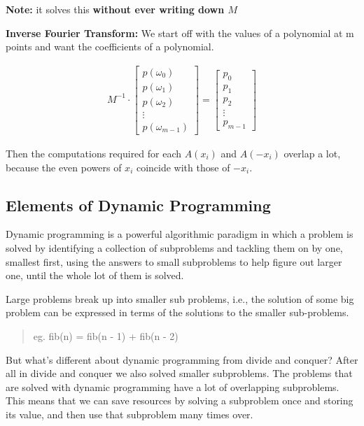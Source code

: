 \documentclass[12pt]{article}
\begin{document}
\textbf{Note:} it solves this \textbf{without ever writing down $M$}


\textbf{Inverse Fourier Transform:}
We start off with the values of a polynomial at m points and want the coefficients of a polynomial.

\begin{align*}
    M^{-1} \cdot \begin{bmatrix}
                     p(\omega_0) \\
                     p(\omega_1) \\
                     p(\omega_2) \\
                     \vdots      \\
                     p(\omega_{m - 1})
                 \end{bmatrix}
    = \begin{bmatrix}
          p_0    \\
          p_1    \\
          p_2    \\
          \vdots \\
          p_{m - 1}
      \end{bmatrix}
\end{align*}

Then the computations required for each $A(x_i)$ and $A(-x_i)$ overlap a lot, because the even powers of $x_i$ coincide with those of $-x_i$.

\lecture[]{}
\lecture[]{}
\lecture[]{}
\lecture[]{}
\lecture[]{}
\subsection{Elements of Dynamic Programming}
Dynamic programming is a powerful algorithmic paradigm in which a problem is solved by identifying a collection of subproblems and tackling them on by one, smallest first, using the answers to small subproblems to help figure out larger one, until the whole lot of them is solved.

Large problems break up into smaller sub problems, i.e., the solution of some big problem can be expressed in terms of the solutions to the smaller sub-problems.
\begin{quotation}
    eg. fib(n) = fib(n - 1) + fib(n - 2)
\end{quotation}
But what's different about dynamic programming from divide and conquer? After all in divide and conquer we also solved smaller subproblems. The problems that are solved with dynamic programming have a lot of overlapping subproblems. This means that we can save resources by solving a subproblem once and storing its value, and then use that subproblem many times over.
\end{document}
